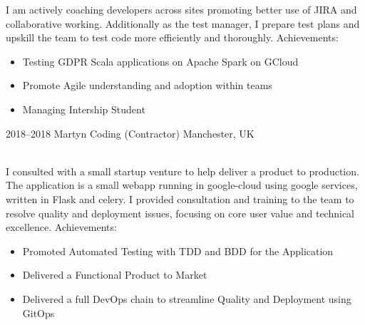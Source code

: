 \documentclass[]{cv-style}          %
\begin{document}
\begin{entrylist}
{  I am actively coaching developers across sites promoting better use of JIRA and collaborative working.
  Additionally as the test manager, I prepare test plans and upskill the team to test code more efficiently and thoroughly.
  Achievements:
  \begin{itemize}
    \item Testing GDPR Scala applications on Apache Spark on GCloud
    \item Promote Agile understanding and adoption within teams
    \item Managing Intership Student
  \end{itemize}
}
\entry
{2018--2018}
{Martyn Coding (Contractor)}
{Manchester, UK}
{\\
I consulted with a small startup venture to help deliver a product to production.
The application is a small webapp running in google-cloud using google services, written in Flask and celery.
I provided consultation and training to the team to resolve quality and deployment issues, focusing on core user value and technical excellence.
Achievements:
\begin{itemize}
  \item Promoted Automated Testing with TDD and BDD for the Application
  \item Delivered a Functional Product to Market
  \item Delivered a full DevOps chain to streamline Quality and Deployment using GitOps
\end{itemize}
}
\end{entrylist}
\end{document}
